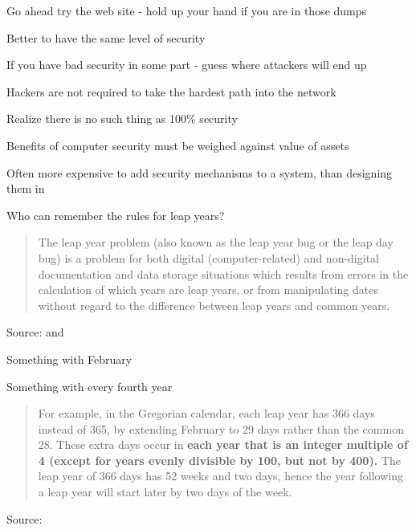 \documentclass[Screen16to9,17pt]{foils}
\begin{document}
\centerline{Go ahead try the web site - hold up your hand if you are in those dumps}





\begin{list1}
\item Better to have the same level of security
\item If you have bad security in some part - guess where attackers will end up
\item Hackers are not required to take the hardest path into the network
\item Realize there is no such thing as 100\% security
\end{list1}


\begin{list1}
\item Benefits of computer security must be weighed against value of assets
\item Often more expensive to add security mechanisms to a system, than designing them in
\end{list1}




Who can remember the rules for leap years?

\begin{quote}
The leap year problem (also known as the leap year bug or the leap day bug) is a problem for both digital (computer-related) and non-digital documentation and data storage situations which results from errors in the calculation of which years are leap years, or from manipulating dates without regard to the difference between leap years and common years.
\end{quote}
Source:  and

\begin{list2}
\item Something with February
\item Something with every fourth year
\end{list2}



\begin{quote}
For example, in the Gregorian calendar, each leap year has 366 days instead of 365, by extending February to 29 days rather than the common 28. These extra days occur in {\bf each year that is an integer multiple of 4 (except for years evenly divisible by 100, but not by 400).} The leap year of 366 days has 52 weeks and two days, hence the year following a leap year will start later by two days of the week.
\end{quote}
Source: 
\end{document}
